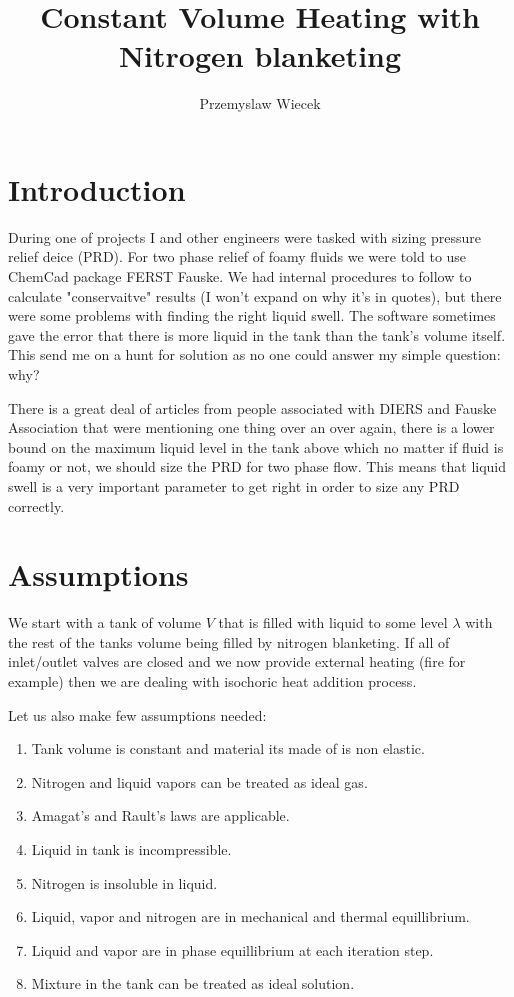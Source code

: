 \documentclass[10pt, letterpaper]{article}
\title{Constant Volume Heating with Nitrogen blanketing}
\author{Przemyslaw Wiecek}
\begin{document}
	\maketitle
	\tableofcontents

	\section{Introduction}
	During one of projects I and other engineers were tasked with sizing pressure relief deice (PRD). For two phase relief of foamy fluids we were told to use ChemCad package FERST Fauske. We had internal procedures to follow to calculate "conservaitve" results (I won't expand on why it's in quotes), but there were some problems with finding the right liquid swell. The software sometimes gave the error that there is more liquid in the tank than the tank's volume itself. This send me on a hunt for solution as no one could answer my simple question: why?

	There is a great deal of articles from people associated with DIERS and Fauske Association that were mentioning one thing over an over again, there is a lower bound on the maximum liquid level in the tank above which no matter if fluid is foamy or not, we should size the PRD for two phase flow. This means that liquid swell is a very important parameter to get right in order to size any PRD correctly.

	\section{Assumptions}

	We start with a tank of volume $V$ that is filled with liquid to some level $\lambda$ with the rest of the tanks volume being filled by nitrogen blanketing. If all of inlet/outlet valves are closed and we now provide external heating (fire for example) then we are dealing with isochoric heat addition process.

	Let us also make few assumptions needed:

	\begin{enumerate}
		\item Tank volume is constant and material its made of is non elastic.
		\item Nitrogen and liquid vapors can be treated as ideal gas.
		\item Amagat's and Rault's laws are applicable.
		\item Liquid in tank is incompressible.
		\item Nitrogen is insoluble in liquid.
		\item Liquid, vapor and nitrogen are in mechanical and thermal equillibrium.
		\item Liquid and vapor are in phase equillibrium at each iteration step.
		\item Mixture in the tank can be treated as ideal solution.
	\end{enumerate}
\end{document}

